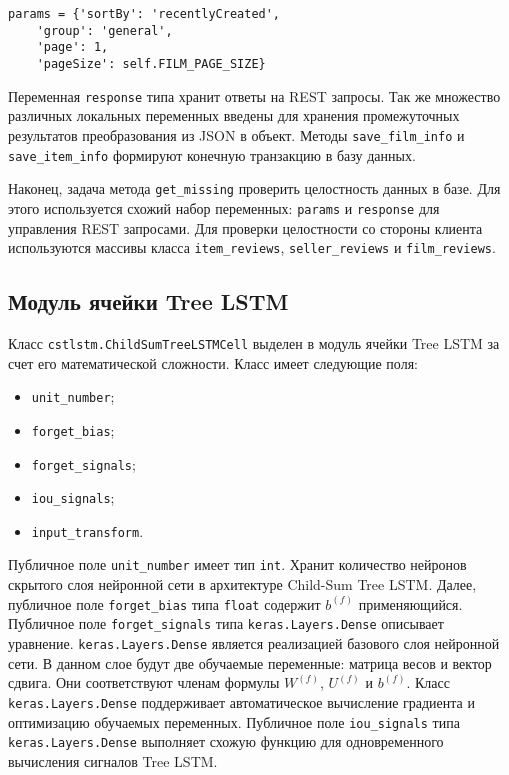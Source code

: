 \medskip
\begin{lstlisting}[style=Python]
  params = {'sortBy': 'recentlyCreated',
    'group': 'general',
    'page': 1,
    'pageSize': self.FILM_PAGE_SIZE}
\end{lstlisting}
\medskip

Переменная \texttt{response} типа хранит ответы на REST запросы. Так же множество различных локальных переменных введены для хранения промежуточных результатов преобразования из JSON в объект. Методы \texttt{save\_fi\-lm\_info} и \texttt{save\_item\_info} формируют конечную транзакцию в базу данных.

Наконец, задача метода \texttt{get\_missing} проверить целостность данных в базе. Для этого используется схожий набор переменных: \texttt{params} и \texttt{res\-ponse} для управления REST запросами. Для проверки целостности со стороны клиента используются массивы класса \texttt{item\_reviews}, \texttt{seller\_re\-views} и \texttt{film\_\-reviews}.
\subsection{Модуль ячейки Tree LSTM}
Класс \texttt{cstlstm.ChildSumTreeLSTMCell} выделен в модуль ячейки Tree LSTM за счет его математической сложности. Класс имеет следующие поля:
\begin{itemize}
\item \texttt{unit\_number};
\item \texttt{forget\_bias};
\item \texttt{forget\_signals};
\item \texttt{iou\_signals};
\item \texttt{input\_transform}.
\end{itemize}

Публичное поле \texttt{unit\_number} имеет тип \texttt{int}. Хранит количество нейронов скрытого слоя нейронной сети в архитектуре Child-Sum Tree LSTM\@. Далее, публичное поле \texttt{forget\_bias} типа \texttt{float} содержит $b^{(f)}$ применяющийся. Публичное поле \texttt{forget\_signals} типа \texttt{keras.Layers.Dense} описывает уравнение. \texttt{keras.Layers.Dense} является реализацией базового слоя нейронной сети. В данном слое будут две обучаемые переменные: матрица весов и вектор сдвига. Они соответствуют членам формулы $W^{(f)}$, $U^{(f)}$ и $b^{(f)}$. Класс \texttt{keras.Layers.Dense} поддерживает автоматическое вычисление градиента и оптимизацию обучаемых переменных. Публичное поле \texttt{iou\_signals} типа \texttt{keras.Layers.Dense} выполняет схожую функцию для одновременного вычисления сигналов Tree LSTM\@.

